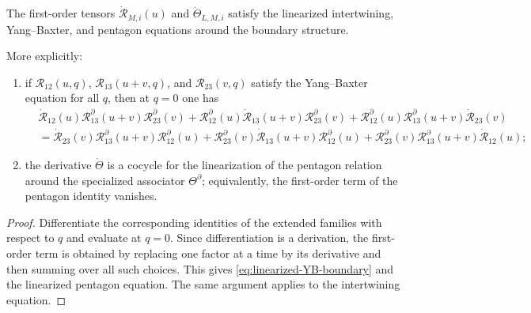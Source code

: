 \begin{theorem}
\ClaimStatusProvedHere
\label{thm:linearized-boundary-equations}
The first-order tensors
$\dot{\mathscr R}_{M,i}(u)$ and $\dot\Theta_{L,M,i}$ satisfy the
linearized intertwining, Yang--Baxter, and pentagon equations around the
boundary structure.

More explicitly:
\begin{enumerate}
 \item if $\mathscr R_{12}(u,q)$,
 $\mathscr R_{13}(u+v,q)$, and $\mathscr R_{23}(v,q)$ satisfy the
 Yang--Baxter equation for all $q$, then at $q=0$ one has
 \begin{align}
 &\dot{\mathscr R}_{12}(u)
 \mathscr R^{\partial}_{13}(u+v)
 \mathscr R^{\partial}_{23}(v)
 +
 \mathscr R^{\partial}_{12}(u)
 \dot{\mathscr R}_{13}(u+v)
 \mathscr R^{\partial}_{23}(v)
 +
 \mathscr R^{\partial}_{12}(u)
 \mathscr R^{\partial}_{13}(u+v)
 \dot{\mathscr R}_{23}(v)
 \nonumber\\
 &=
 \dot{\mathscr R}_{23}(v)
 \mathscr R^{\partial}_{13}(u+v)
 \mathscr R^{\partial}_{12}(u)
 +
 \mathscr R^{\partial}_{23}(v)
 \dot{\mathscr R}_{13}(u+v)
 \mathscr R^{\partial}_{12}(u)
 +
 \mathscr R^{\partial}_{23}(v)
 \mathscr R^{\partial}_{13}(u+v)
 \dot{\mathscr R}_{12}(u);
 \label{eq:linearized-YB-boundary}
 \end{align}
 \item the derivative $\dot\Theta$ is a cocycle for the linearization
 of the pentagon relation around the specialized associator
 $\Theta^{\partial}$; equivalently, the first-order term of the
 pentagon identity vanishes.
\end{enumerate}
\end{theorem}

\begin{proof}
Differentiate the corresponding identities of the extended families with
respect to $q$ and evaluate at $q=0$. Since differentiation is a
derivation, the first-order term is obtained by replacing one factor at a
time by its derivative and then summing over all such choices. This gives
\eqref{eq:linearized-YB-boundary} and the linearized pentagon equation.
The same argument applies to the intertwining equation.
\end{proof}


